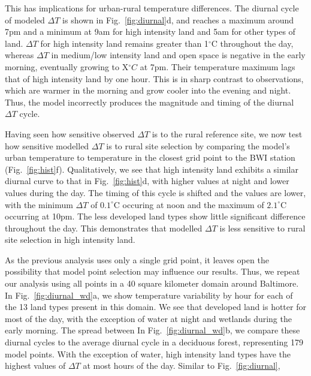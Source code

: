 \documentclass[draft,linenumbers]{agujournal}
\begin{document}
 This has implications for urban-rural temperature differences. The diurnal cycle of modeled $\Delta T$ is shown in Fig.~\ref{fig:diurnal}d, and reaches a maximum around 7pm and a minimum at 9am for high intensity land and 5am for other types of land. $\Delta T$ for high intensity land remains greater than 1$^\circ$C throughout the day, whereas $\Delta T$ in medium/low intensity land and open space is negative in the early morning, eventually growing to X$^\circ C$ at 7pm. Their temperature maximum lags that of high intensity land by one hour. This is in sharp contrast to observations, which are warmer in the morning and grow cooler into the evening and night. Thus, the model incorrectly produces the magnitude and timing of the diurnal $\Delta T$ cycle. %
 
Having seen how sensitive observed $\Delta T$ is to the rural reference site, we now test how sensitive modelled $\Delta T$ is to rural site selection by comparing the model's urban temperature to temperature in the closest grid point to the BWI station (Fig.~\ref{fig:hist}f).
Qualitatively, we see that high intensity land exhibits a similar diurnal curve to that in Fig.~\ref{fig:hist}d, with higher values at night and lower values during the day. The timing of this cycle is shifted and the values are lower, with the minimum $\Delta T$ of $0.1^\circ$C occuring at noon and the maximum of $2.1^\circ$C occurring at 10pm. The less developed land types show little significant difference throughout the day. 
This demonstrates that modelled $\Delta T$ is less sensitive to rural site selection in high intensity land. 

As the previous analysis uses only a single grid point, it leaves open the possibility that model point selection may influence our results. Thus, we repeat our analysis using all points in a 40 square kilometer domain around Baltimore. In Fig.~\ref{fig:diurnal_wd}a, we show temperature variability by hour for each of the 13 land types present in this domain. We see that developed land is hotter for most of the day, with the exception of water at night and wetlands during the early morning. The spread between 
In Fig.~\ref{fig:diurnal_wd}b, we compare these diurnal cycles to the average diurnal cycle in a deciduous forest, representing 179 model points. With the exception of water, high intensity land types have the highest values of $\Delta T$ at most hours of the day. Similar to Fig.~\ref{fig:diurnal}, 
 
\end{document}
